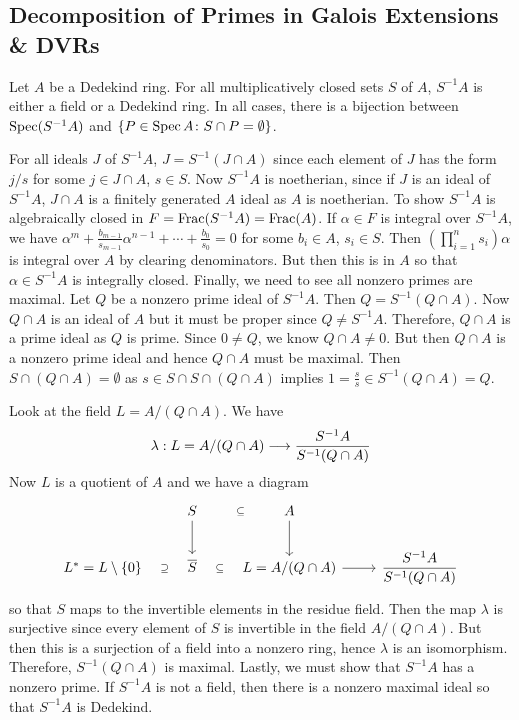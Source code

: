 \newpage
\subsection{Decomposition of Primes in Galois Extensions \& DVRs\label{sec:620_8}}

\begin{lem}
Let $A$ be a Dedekind ring. For all multiplicatively closed sets $S$ of $A$, $S^{-1}A$ is either a field or a Dedekind ring. In all cases, there is a bijection between $\operatorname{Spec}(S^{-1}A)$ and $\{P \in \operatorname{Spec} A \colon S \cap P =\emptyset\}$.
\end{lem}

\pf For all ideals $J$ of $S^{-1}A$, $J=S^{-1}(J \cap A)$ since each element of $J$ has the form $j/s$ for some $j \in J \cap A$, $s \in S$. Now $S^{-1}A$ is noetherian, since if $J$ is an ideal of $S^{-1}A$, $J \cap A$ is a finitely generated $A$ ideal as $A$ is noetherian. To show $S^{-1}A$ is algebraically closed in $F=\operatorname{Frac}(S^{-1}A)=\operatorname{Frac}(A)$. If $\alpha \in F$ is integral over $S^{-1}A$, we have $\alpha^m+ \frac{b_{m-1}}{s_{m-1}} \alpha^{n-1}+\cdots+\frac{b_0}{s_0}=0$ for some $b_i \in A$, $s_i \in S$. Then $(\prod_{i=1}^n s_i) \alpha$ is integral over $A$ by clearing denominators. But then this is in $A$ so that $\alpha \in S^{-1}A$ is integrally closed. Finally, we need to see all nonzero primes are maximal. Let $Q$ be a nonzero prime ideal of $S^{-1}A$. Then $Q=S^{-1}(Q \cap A)$. Now $Q \cap A$ is an ideal of $A$ but it must be proper since $Q \neq S^{-1}A$. Therefore, $Q \cap A$ is a prime ideal as $Q$ is prime. Since $0 \neq Q$, we know $Q \cap A \neq 0$. But then $Q \cap A$ is a nonzero prime ideal and hence $Q \cap A$ must be maximal. Then $S \cap (Q \cap A) =\emptyset$ as $s \in S \cap S \cap (Q \cap A)$ implies $1=\frac{s}{s} \in S^{-1}(Q \cap A)= Q$. 

Look at the field $L=A/(Q \cap A)$. We have 
	\[
	\lambda: L= A/(Q \cap A) \stackrel{}{\longrightarrow} \dfrac{S^{-1}A}{S^{-1}(Q \cap A)}
	\]
Now $L$ is a quotient of $A$ and we have a diagram
	\[
	\begin{tikzcd}
	\phantom{x} & S \arrow[draw=none]{r}[sloped,auto=false]{\subseteq} \arrow{d} & A \arrow{d} & \\
	L^*=L\setminus \{0\} \arrow[draw=none]{r}[sloped,auto=false]{\supseteq} & \overline{S} \arrow[draw=none]{r}[sloped,auto=false]{\subseteq} & L = A/(Q \cap A ) \arrow{r} & \dfrac{S^{-1} A}{S^{-1}(Q \cap A)}
	\end{tikzcd}
	\]
so that $S$ maps to the invertible elements in the residue field. Then the map $\lambda$ is surjective since every element of $S$ is invertible in the field $A/(Q \cap A)$. But then this is a surjection of a field into a nonzero ring, hence $\lambda$ is an isomorphism. Therefore, $S^{-1}(Q \cap A)$ is maximal. Lastly, we must show that $S^{-1}A$ has a nonzero prime. If $S^{-1}A$ is not a field, then there is a nonzero maximal ideal so that $S^{-1}A$ is Dedekind. 

